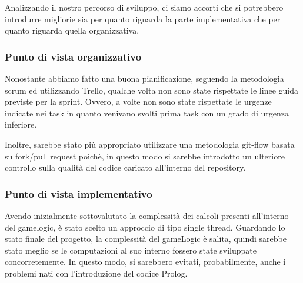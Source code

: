 Analizzando il nostro percorso di sviluppo, ci siamo accorti che si potrebbero introdurre migliorie sia per quanto riguarda la parte implementativa che per quanto riguarda quella organizzativa.

\subsubsection{Punto di vista organizzativo}
Nonostante abbiamo fatto una buona pianificazione, seguendo la metodologia scrum ed utilizzando Trello, qualche volta non sono state rispettate le linee guida previste per la sprint. Ovvero, a volte non sono state rispettate le urgenze indicate nei task in quanto venivano svolti prima task con un grado di urgenza inferiore.

Inoltre, sarebbe stato più appropriato utilizzare una metodologia git-flow basata su fork/pull request poichè, in questo modo si sarebbe introdotto un ulteriore controllo sulla qualità del codice caricato all'interno del repository.

\subsubsection{Punto di vista implementativo}
Avendo inizialmente sottovalutato la complessità dei calcoli presenti all'interno del gamelogic, è stato scelto un approccio di tipo single thread. Guardando lo stato finale del progetto, la complessità del gameLogic è salita, quindi sarebbe stato meglio se le computazioni al suo interno fossero state sviluppate concorretemente. In questo modo, si sarebbero evitati, probabilmente, anche i problemi nati con l'introduzione del codice Prolog.

